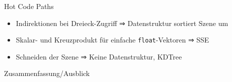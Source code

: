 	\begin{frame}{Hot Code Paths}
		\begin{itemize}
		\pause
		\item Indirektionen bei Dreieck-Zugriff ⇒ Datenstruktur sortiert Szene um
		\pause
		\item Skalar- und Kreuzprodukt für einfache \texttt{float}-Vektoren ⇒ SSE
		\pause
		\item Schneiden der Szene ⇒ Keine Datenstruktur, KDTree
		\end{itemize}
	\end{frame}

	\begin{frame}{Zusammenfassung/Ausblick}
		
	\end{frame}

